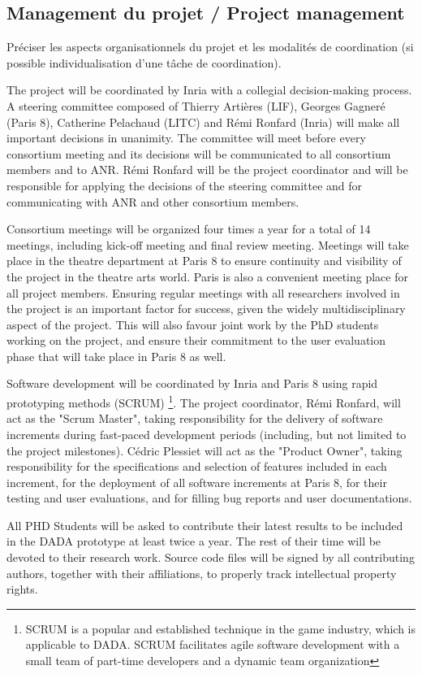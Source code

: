 
\subsection{Management du projet / Project management}
\begin{xcomment}  
Pr\'eciser les aspects organisationnels du projet et les modalit\'es de coordination (si possible individualisation d'une tâche de coordination).
\end{xcomment}


The project will be coordinated by Inria with a collegial decision-making process. A steering committee composed of Thierry Arti\`eres (LIF), 
Georges Gagner\'e (Paris 8), Catherine Pelachaud (LITC) and R\'emi Ronfard (Inria) will make all important decisions  in unanimity. 
The committee will meet before every consortium meeting and its decisions will be 
communicated to all consortium members and to ANR. R\'emi Ronfard will be the project coordinator and will be responsible for applying
the decisions of the steering committee and for communicating with ANR and other consortium members. 


Consortium meetings will be organized four times a year for a total of 14 meetings, including kick-off meeting and final review meeting. 
Meetings will take place in the theatre department at Paris 8 to ensure continuity and visibility of the project in the theatre arts world. Paris is also 
a convenient meeting place for all project members. Ensuring regular meetings with all researchers involved in the project is an important
factor for success, given the widely multidisciplinary aspect of the project. This will also favour joint work by the PhD students working
on the project, and ensure their commitment to the user evaluation phase that will take place in Paris 8 as well. 

Software development will be coordinated by Inria and Paris 8 using rapid prototyping methods (SCRUM) \footnote{SCRUM is a popular
and established technique in the game industry, which is applicable to DADA. SCRUM facilitates agile software development
with a small team of part-time developers and a dynamic team organization}. The project coordinator, R\'emi Ronfard,
will act as the "Scrum Master", taking responsibility for the delivery of software increments during fast-paced development periods (including, but not limited to 
the project milestones). C\'edric Plessiet will act as the "Product Owner", taking responsibility for the specifications and selection of features included in each increment,
for the deployment of all software increments at Paris 8, for their testing and user evaluations, and for filling bug reports and user documentations.

All PHD Students will be asked to contribute their latest results to be included in the DADA prototype at least twice a year. 
The rest of their time will be devoted to their research work. Source code files will be signed by all contributing authors, 
together with their affiliations, to properly  track intellectual property rights.



\endinput

